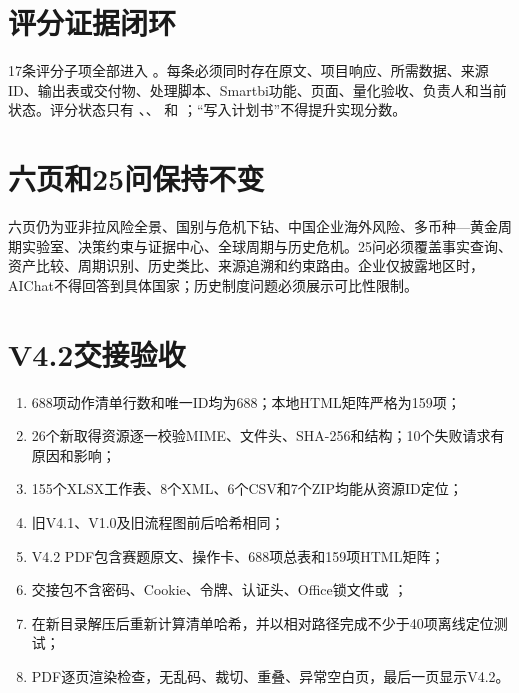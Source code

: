 \section{评分证据闭环}

17条评分子项全部进入 。每条必须同时存在原文、项目响应、所需数据、来源ID、输出表或交付物、处理脚本、Smartbi功能、页面、量化验收、负责人和当前状态。评分状态只有 、、 和 ；“写入计划书”不得提升实现分数。

\section{六页和25问保持不变}

六页仍为亚非拉风险全景、国别与危机下钻、中国企业海外风险、多币种—黄金周期实验室、决策约束与证据中心、全球周期与历史危机。25问必须覆盖事实查询、资产比较、周期识别、历史类比、来源追溯和约束路由。企业仅披露地区时，AIChat不得回答到具体国家；历史制度问题必须展示可比性限制。

\section{V4.2交接验收}

\begin{enumerate}
  \item 688项动作清单行数和唯一ID均为688；本地HTML矩阵严格为159项；
  \item 26个新取得资源逐一校验MIME、文件头、SHA-256和结构；10个失败请求有原因和影响；
  \item 155个XLSX工作表、8个XML、6个CSV和7个ZIP均能从资源ID定位；
  \item 旧V4.1、V1.0及旧流程图前后哈希相同；
  \item V4.2 PDF包含赛题原文、操作卡、688项总表和159项HTML矩阵；
  \item 交接包不含密码、Cookie、令牌、认证头、Office锁文件或 ；
  \item 在新目录解压后重新计算清单哈希，并以相对路径完成不少于40项离线定位测试；
  \item PDF逐页渲染检查，无乱码、裁切、重叠、异常空白页，最后一页显示V4.2。
\end{enumerate}


